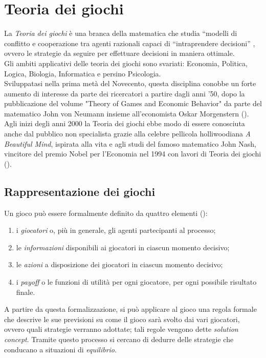 \section{Teoria dei giochi}

La \emph{Teoria dei giochi} è una branca della matematica che studia ``modelli di conflitto e cooperazione tra agenti razionali capaci di ``intraprendere decisioni'' \cite{gtheory}, ovvero le strategie da seguire per effettuare decisioni in maniera ottimale.\\
Gli ambiti applicativi delle teoria dei giochi sono svariati: Economia, Politica, Logica, Biologia, Informatica e persino Psicologia.\\
Sviluppatasi nella prima metà del Novecento, questa disciplina conobbe un forte aumento di interesse da parte dei ricercatori a partire dagli anni '50, dopo la pubblicazione del volume "Theory of Games and Economic Behavior" da parte del matematico John von Neumann insieme all'economista Oskar Morgenstern (\cite{tog}). Agli inizi degli anni 2000 la Teoria dei giochi ebbe modo di essere conosciuta anche dal pubblico non specialista grazie alla celebre pellicola holliwoodiana \emph{A Beautiful Mind}, ispirata alla vita e agli studi del famoso matematico John Nash, vincitore del premio Nobel per l'Economia nel 1994 con lavori di Teoria dei giochi (\cite{jnash}).


\subsection{Rappresentazione dei giochi}

Un gioco può essere formalmente definito da quattro elementi (\cite{ramusen}):
\begin{enumerate}
   \item i \emph{giocatori} o, più in generale, gli agenti partecipanti al processo;
   \item le \emph{informazioni} disponibili ai giocatori in ciascun momento decisivo;
   \item le \emph{azioni} a disposizione dei giocatori in ciascun momento decisivo;
   \item i \emph{payoff} o le funzioni di utilità per ogni giocatore, per ogni possibile risultato finale.   
\end{enumerate}
A partire da questa formalizzazione, si  può applicare al gioco una regola formale che descrive le sue previsioni su come il gioco sarà svolto dai vari giocatori, ovvero quali strategie verranno adottate; tali regole vengono dette \emph{solution concept}. Tramite questo processo si cercano di dedurre delle strategie che conducano a situazioni di \emph{equilibrio}.



